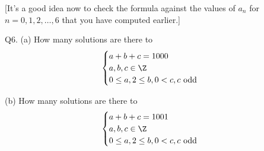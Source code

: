 \documentclass[a4paper,12pt]{article}
\begin{document}
[It's a good idea now to check the formula against the values of
$a_n$ for $n = 0, 1, 2, \ldots, 6$ that you have computed earlier.]

\SOLUTION





\newpage
Q6.
(a) How many solutions are there to
\[
\begin{cases}
a + b + c = 1000 \\
a,b,c \in \Z \\
0 \leq a, 2 \leq b, 0 < c, c \text{ odd}
\end{cases}
\]

(b)
How many solutions are there to
\[
\begin{cases}
a + b + c = 1001 \\
a,b,c \in \Z \\
0 \leq a, 2 \leq b, 0 < c, c \text{ odd}
\end{cases}
\]


\SOLUTION






	
\end{document}
